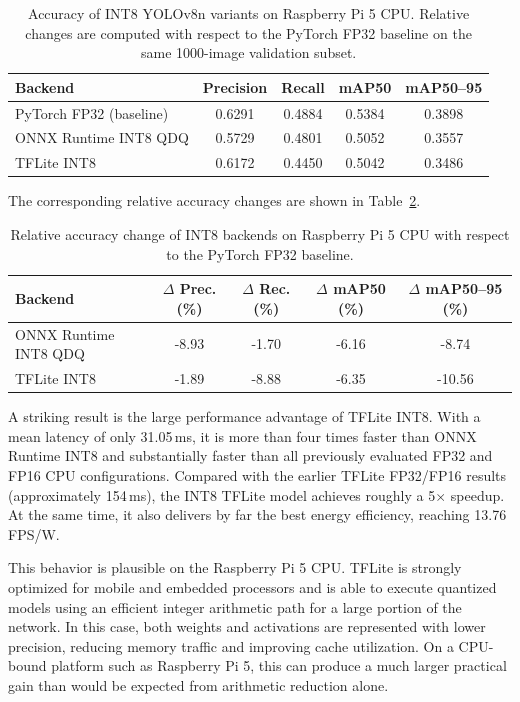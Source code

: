 \documentclass[12pt,a4paper]{report}
\begin{document}
\begin{table}[ht]
\centering
\caption{Accuracy of INT8 YOLOv8n variants on Raspberry Pi 5 CPU. Relative changes are computed
with respect to the PyTorch FP32 baseline on the same 1000-image validation subset.}
\label{tab:pi5_int8_accuracy}
\begin{tabular}{lcccc}
\toprule
Backend & Precision & Recall & mAP50 & mAP50--95 \\
\midrule
PyTorch FP32 (baseline) & 0.6291 & 0.4884 & 0.5384 & 0.3898 \\
ONNX Runtime INT8 QDQ   & 0.5729 & 0.4801 & 0.5052 & 0.3557 \\
TFLite INT8             & 0.6172 & 0.4450 & 0.5042 & 0.3486 \\
\bottomrule
\end{tabular}
\end{table}

The corresponding relative accuracy changes are shown in Table~\ref{tab:pi5_int8_accuracy_relative}.

\begin{table}[ht]
\centering
\caption{Relative accuracy change of INT8 backends on Raspberry Pi 5 CPU with respect to the
PyTorch FP32 baseline.}
\label{tab:pi5_int8_accuracy_relative}
\begin{tabular}{lcccc}
\toprule
Backend & $\Delta$ Prec. (\%) & $\Delta$ Rec. (\%) & $\Delta$ mAP50 (\%) & $\Delta$ mAP50--95 (\%) \\
\midrule
ONNX Runtime INT8 QDQ & -8.93 & -1.70 & -6.16 & -8.74 \\
TFLite INT8           & -1.89 & -8.88 & -6.35 & -10.56 \\
\bottomrule
\end{tabular}
\end{table}

A striking result is the large performance advantage of TFLite INT8. With a mean latency of only
31.05\,ms, it is more than four times faster than ONNX Runtime INT8 and substantially faster than
all previously evaluated FP32 and FP16 CPU configurations. Compared with the earlier TFLite FP32/FP16
results (approximately 154\,ms), the INT8 TFLite model achieves roughly a 5$\times$ speedup. At the
same time, it also delivers by far the best energy efficiency, reaching 13.76 FPS/W.

This behavior is plausible on the Raspberry Pi 5 CPU. TFLite is strongly optimized for mobile and
embedded processors and is able to execute quantized models using an efficient integer arithmetic
path for a large portion of the network. In this case, both weights and activations are represented
with lower precision, reducing memory traffic and improving cache utilization. On a CPU-bound platform
such as Raspberry Pi 5, this can produce a much larger practical gain than would be expected from
arithmetic reduction alone.
\end{document}
